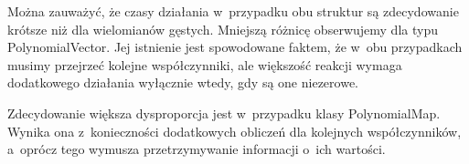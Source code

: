 Można zauważyć, że czasy działania w~przypadku obu struktur są zdecydowanie krótsze niż dla wielomianów gęstych. Mniejszą różnicę obserwujemy dla typu PolynomialVector. Jej istnienie jest spowodowane faktem, że w~obu przypadkach musimy przejrzeć kolejne współczynniki, ale większość reakcji wymaga dodatkowego działania wyłącznie wtedy, gdy są one niezerowe.

Zdecydowanie większa dysproporcja jest w~przypadku klasy PolynomialMap. Wynika ona z~konieczności dodatkowych obliczeń dla kolejnych współczynników, a~oprócz tego wymusza przetrzymywanie informacji o~ich wartości.
